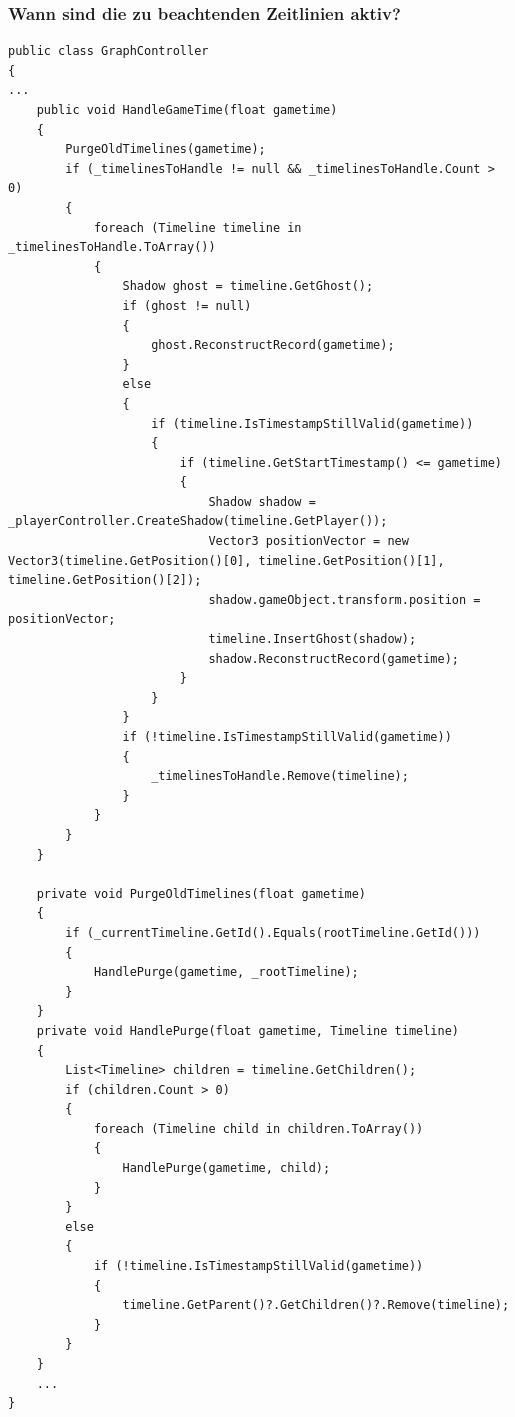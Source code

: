 \subsubsection{Wann sind die zu beachtenden Zeitlinien aktiv?}\label{sec:good_03}
\begin{lstlisting}[caption={Haupt Gameloop der Mechanik aus dem Gamedesign Workshop}, label={sec:handleGameTime_old}]
public class GraphController
{
...
    public void HandleGameTime(float gametime)
    {
        PurgeOldTimelines(gametime);
        if (_timelinesToHandle != null && _timelinesToHandle.Count > 0)
        {
            foreach (Timeline timeline in _timelinesToHandle.ToArray())
            {
                Shadow ghost = timeline.GetGhost();
                if (ghost != null)
                {
                    ghost.ReconstructRecord(gametime);
                }
                else
                {
                    if (timeline.IsTimestampStillValid(gametime))
                    {
                        if (timeline.GetStartTimestamp() <= gametime)
                        {
                            Shadow shadow = _playerController.CreateShadow(timeline.GetPlayer());
                            Vector3 positionVector = new Vector3(timeline.GetPosition()[0], timeline.GetPosition()[1], timeline.GetPosition()[2]);
                            shadow.gameObject.transform.position = positionVector;
                            timeline.InsertGhost(shadow);
                            shadow.ReconstructRecord(gametime);
                        }
                    }
                }
                if (!timeline.IsTimestampStillValid(gametime))
                {
                    _timelinesToHandle.Remove(timeline);
                }
            }
        }
    }

    private void PurgeOldTimelines(float gametime)
    {
        if (_currentTimeline.GetId().Equals(rootTimeline.GetId()))
        {
            HandlePurge(gametime, _rootTimeline);
        }
    }
    private void HandlePurge(float gametime, Timeline timeline)
    {
        List<Timeline> children = timeline.GetChildren();
        if (children.Count > 0)
        {
            foreach (Timeline child in children.ToArray())
            {
                HandlePurge(gametime, child);
            }
        }
        else
        {
            if (!timeline.IsTimestampStillValid(gametime))
            {
                timeline.GetParent()?.GetChildren()?.Remove(timeline);
            }
        }
    }
    ...
}
\end{lstlisting}

